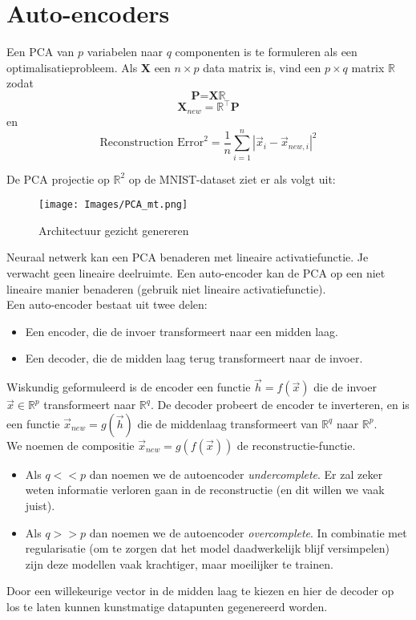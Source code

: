 {\section{Auto-encoders}
Een PCA van $p$ variabelen naar $q$ componenten is te formuleren als een optimalisatieprobleem. Als \textbf{X} een $n \times p$ data matrix is, vind een $p \times q$ matrix $\mathbb{R}$ zodat 
\[
\textbf{P=X}\mathbb{R}\]
\[\textbf{X}_{new}=\mathbb{R}^\top \textbf{P}
\]
en
\[\textrm{Reconstruction Error}^2=\frac{1}{n}\sum_{i=1}^n|\overrightarrow{x}_i-\overrightarrow{x}_{new,i}|^2\]

\noindent De PCA projectie op $\mathbb{R}^2$ op de MNIST-dataset ziet er als volgt uit:

\begin{figure}[h]
    \centering
    \texttt{[image: Images/PCA\_mt.png]}
    \caption{Architectuur gezicht genereren}
    \label{fig:generatedfaces}
\end{figure}

\noindent
Neuraal netwerk kan een PCA benaderen met lineaire activatiefunctie. Je verwacht geen lineaire deelruimte. Een auto-encoder kan de PCA op een niet lineaire manier benaderen (gebruik niet lineaire activatiefunctie).\\

\noindent Een auto-encoder bestaat uit twee delen:
\begin{itemize}
    \item Een encoder, die de invoer transformeert naar een midden laag.
    \item Een decoder, die de midden laag terug transformeert naar de invoer.
\end{itemize}
Wiskundig geformuleerd is de encoder een functie $\overrightarrow{h}=f(\overrightarrow{x})$ die de invoer $\overrightarrow{x} \in \mathbb{R}^p$ transformeert naar $\mathbb{R}^q$. De decoder probeert de encoder te inverteren, en is een functie $\overrightarrow{x}_{new}=g(\overrightarrow{h})$ die de middenlaag transformeert van $\mathbb{R}^q$ naar $\mathbb{R}^p$. \\

We noemen de compositie $\overrightarrow{x}_{new}=g(f(\overrightarrow{x}))$ de reconstructie-functie.
\begin{itemize}
    \item Als $q<<p$ dan noemen we de autoencoder \textit{undercomplete}. Er zal zeker weten informatie verloren gaan in de reconstructie (en dit willen we vaak juist).
    \item Als $q>>p$ dan noemen we de autoencoder \textit{overcomplete}. In combinatie met regularisatie (om te zorgen dat het model daadwerkelijk blijf versimpelen) zijn deze modellen vaak krachtiger, maar moeilijker te trainen.
\end{itemize}
Door een willekeurige vector in de midden laag te kiezen en hier de decoder op los te laten kunnen kunstmatige datapunten gegenereerd worden.

}
